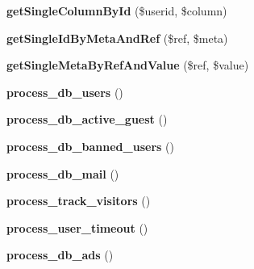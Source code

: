 \begin{DoxyCompactItemize}
\item 
\hypertarget{class_my_s_q_l_d_b_aa728f26302d85e8a3677d3b0da481900}{{\bfseries get\-Single\-Column\-By\-Id} (\$userid, \$column)}\label{class_my_s_q_l_d_b_aa728f26302d85e8a3677d3b0da481900}

\item 
\hypertarget{class_my_s_q_l_d_b_a91769deb4c51c571147293df3bc36549}{{\bfseries get\-Single\-Id\-By\-Meta\-And\-Ref} (\$ref, \$meta)}\label{class_my_s_q_l_d_b_a91769deb4c51c571147293df3bc36549}

\item 
\hypertarget{class_my_s_q_l_d_b_ad63e4175ae9110b0b3c3d654ce73ef77}{{\bfseries get\-Single\-Meta\-By\-Ref\-And\-Value} (\$ref, \$value)}\label{class_my_s_q_l_d_b_ad63e4175ae9110b0b3c3d654ce73ef77}

\item 
\hypertarget{class_my_s_q_l_d_b_a0b003010d396cf983f238a40ab84de3b}{{\bfseries process\-\_\-db\-\_\-users} ()}\label{class_my_s_q_l_d_b_a0b003010d396cf983f238a40ab84de3b}

\item 
\hypertarget{class_my_s_q_l_d_b_a002f96e9dd5a22750b736da45920dbe6}{{\bfseries process\-\_\-db\-\_\-active\-\_\-guest} ()}\label{class_my_s_q_l_d_b_a002f96e9dd5a22750b736da45920dbe6}

\item 
\hypertarget{class_my_s_q_l_d_b_a8917650eecd52d33545aceceabfc62d6}{{\bfseries process\-\_\-db\-\_\-banned\-\_\-users} ()}\label{class_my_s_q_l_d_b_a8917650eecd52d33545aceceabfc62d6}

\item 
\hypertarget{class_my_s_q_l_d_b_ad1b2b52acfcdc56aae70f9b00a70203d}{{\bfseries process\-\_\-db\-\_\-mail} ()}\label{class_my_s_q_l_d_b_ad1b2b52acfcdc56aae70f9b00a70203d}

\item 
\hypertarget{class_my_s_q_l_d_b_a3138a78fd6b956a240a24cef3a181e27}{{\bfseries process\-\_\-track\-\_\-visitors} ()}\label{class_my_s_q_l_d_b_a3138a78fd6b956a240a24cef3a181e27}

\item 
\hypertarget{class_my_s_q_l_d_b_af336dbfd108a098c103bf4e512e2cd1d}{{\bfseries process\-\_\-user\-\_\-timeout} ()}\label{class_my_s_q_l_d_b_af336dbfd108a098c103bf4e512e2cd1d}

\item 
\hypertarget{class_my_s_q_l_d_b_a9abb6566a84ef52365dafa84bcb0aaa5}{{\bfseries process\-\_\-db\-\_\-ads} ()}\label{class_my_s_q_l_d_b_a9abb6566a84ef52365dafa84bcb0aaa5}


\end{DoxyCompactItemize}
